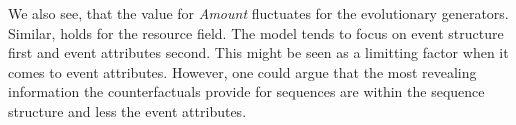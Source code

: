 \documentclass[./../../paper.tex]{subfiles}
\begin{document}


%     
    
%     
    

We also see, that the value for \emph{Amount} fluctuates for the evolutionary generators. Similar, holds for the resource field. The model tends to focus on event structure first and event attributes second. This might be seen as a limitting factor when it comes to event attributes. However, one could argue that the most revealing information the counterfactuals provide for sequences are within the sequence structure and less the event attributes. 





\end{document}
